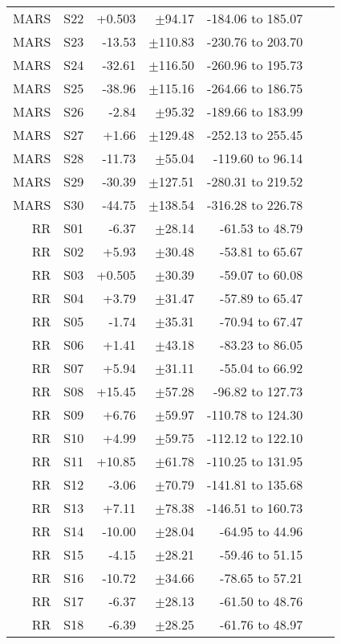 \begin{table}
\begin{tabular}{rrrrrrr}
 MARS &  S22 & +0.503 &  $\pm$94.17 & -184.06 to 185.07 \\
 MARS &  S23 & -13.53 & $\pm$110.83 & -230.76 to 203.70 \\
 MARS &  S24 & -32.61 & $\pm$116.50 & -260.96 to 195.73 \\
 MARS &  S25 & -38.96 & $\pm$115.16 & -264.66 to 186.75 \\
 MARS &  S26 &  -2.84 &  $\pm$95.32 & -189.66 to 183.99 \\
 MARS &  S27 &  +1.66 & $\pm$129.48 & -252.13 to 255.45 \\
 MARS &  S28 & -11.73 &  $\pm$55.04 &  -119.60 to 96.14 \\
 MARS &  S29 & -30.39 & $\pm$127.51 & -280.31 to 219.52 \\
 MARS &  S30 & -44.75 & $\pm$138.54 & -316.28 to 226.78 \\
   RR &  S01 &  -6.37 &  $\pm$28.14 &   -61.53 to 48.79 \\
   RR &  S02 &  +5.93 &  $\pm$30.48 &   -53.81 to 65.67 \\
   RR &  S03 & +0.505 &  $\pm$30.39 &   -59.07 to 60.08 \\
   RR &  S04 &  +3.79 &  $\pm$31.47 &   -57.89 to 65.47 \\
   RR &  S05 &  -1.74 &  $\pm$35.31 &   -70.94 to 67.47 \\
   RR &  S06 &  +1.41 &  $\pm$43.18 &   -83.23 to 86.05 \\
   RR &  S07 &  +5.94 &  $\pm$31.11 &   -55.04 to 66.92 \\
   RR &  S08 & +15.45 &  $\pm$57.28 &  -96.82 to 127.73 \\
   RR &  S09 &  +6.76 &  $\pm$59.97 & -110.78 to 124.30 \\
   RR &  S10 &  +4.99 &  $\pm$59.75 & -112.12 to 122.10 \\
   RR &  S11 & +10.85 &  $\pm$61.78 & -110.25 to 131.95 \\
   RR &  S12 &  -3.06 &  $\pm$70.79 & -141.81 to 135.68 \\
   RR &  S13 &  +7.11 &  $\pm$78.38 & -146.51 to 160.73 \\
   RR &  S14 & -10.00 &  $\pm$28.04 &   -64.95 to 44.96 \\
   RR &  S15 &  -4.15 &  $\pm$28.21 &   -59.46 to 51.15 \\
   RR &  S16 & -10.72 &  $\pm$34.66 &   -78.65 to 57.21 \\
   RR &  S17 &  -6.37 &  $\pm$28.13 &   -61.50 to 48.76 \\
   RR &  S18 &  -6.39 &  $\pm$28.25 &   -61.76 to 48.97 \\

\end{tabular}
\end{table}
